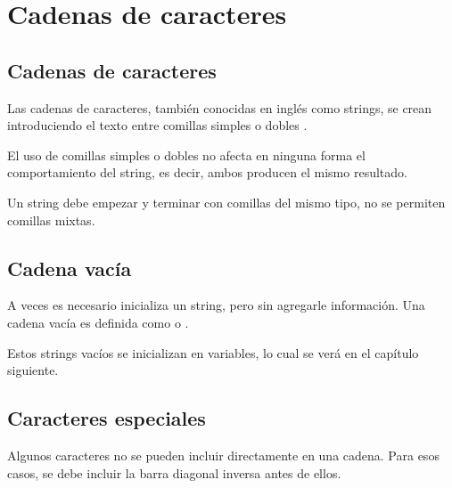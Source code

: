 \chapter{Cadenas de caracteres}

\section{Cadenas de caracteres}

Las cadenas de caracteres, también conocidas en inglés como strings, se crean introduciendo el texto entre comillas simples \ttt{\q \q} o dobles \ttt{\qq \qq}.


El uso de comillas simples o dobles no afecta en ninguna forma el comportamiento del string, es decir, ambos producen el mismo resultado.

Un string debe empezar y terminar con comillas del mismo tipo, no se permiten comillas mixtas.


\section{Cadena vacía}

A veces es necesario inicializa un string, pero sin agregarle información.
Una cadena vacía es definida como \ttt{\q \q} o \ttt{\qq \qq}.


Estos strings vacíos se inicializan en variables, lo cual se verá en el capítulo siguiente.

\section{Caracteres especiales}

Algunos caracteres no se pueden incluir directamente en una cadena.
Para esos casos, se debe incluir la barra diagonal inversa \ttt{\textbackslash} antes de ellos.


